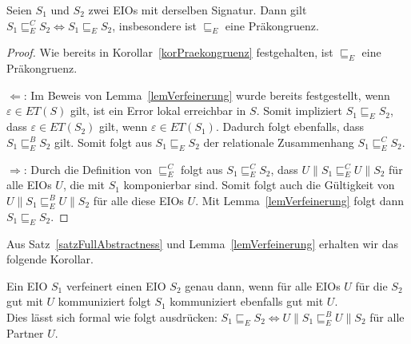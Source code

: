 \begin{satz}
  \label{satzFullAbstractness}
  Seien $S_1$ und $S_2$ zwei EIOs mit derselben Signatur. Dann gilt $S_1\sqsubseteq
  _E^C S_2\Leftrightarrow S_1\sqsubseteq _E S_2$, insbesondere ist $\sqsubseteq _E$
  eine Präkongruenz.
\end{satz}

\begin{proof}
  Wie bereits in Korollar~\ref{korPraekongruenz} festgehalten, ist $\sqsubseteq _E$ eine
  Präkongruenz.

  \glqq $\Leftarrow$\grqq : Im Beweis von Lemma~\ref{lemVerfeinerung} wurde
  bereits festgestellt, wenn
      $\varepsilon\in ET(S)$ gilt, ist ein Error lokal erreichbar in $S$.
      Somit impliziert $S_1\sqsubseteq _E S_2$, dass $\varepsilon\in
      ET(S_2)$ gilt, wenn $\varepsilon\in ET(S_1)$. Dadurch folgt ebenfalls,
      dass $S_1\sqsubseteq _E^B S_2$ gilt. Somit folgt aus $S_1\sqsubseteq
      _E S_2$ der relationale Zusammenhang $S_1\sqsubseteq _E^C S_2$.

  \glqq $\Rightarrow$\grqq : Durch die Definition von $\sqsubseteq _E^C$ folgt aus
  $S_1\sqsubseteq _E^C S_2$, dass $U\|S_1\sqsubseteq _E^C U\|S_2$ für alle EIOs $U$, die mit
  $S_1$ komponierbar sind. Somit folgt auch die Gültigkeit von
  $U\|S_1\sqsubseteq _E^B U\|S_2$ für alle diese EIOs $U$. Mit
  Lemma~\ref{lemVerfeinerung} folgt dann $S_1\sqsubseteq _E S_2$.
\end{proof}

Aus Satz~\ref{satzFullAbstractness} und Lemma~\ref{lemVerfeinerung} erhalten
wir das folgende Korollar.

\begin{kor}
  Ein EIO $S_1$ verfeinert einen EIO $S_2$ genau dann, wenn für alle EIOs $U$
  für die $S_2$ gut mit $U$ kommuniziert folgt $S_1$ kommuniziert
  ebenfalls gut mit $U$.\\
  Dies lässt sich formal wie folgt ausdrücken: $S_1\sqsubseteq _E S_2
  \Leftrightarrow U\|S_1\sqsubseteq _E^B U\|S_2$ für alle Partner $U$.
\end{kor}
